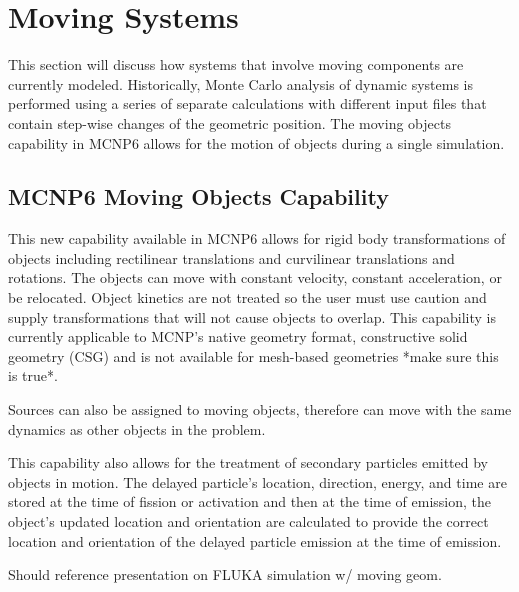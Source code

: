 \section{Moving Systems} \label{sec:moving_sys}
This section will discuss how systems that involve moving components are
currently modeled.
Historically, Monte Carlo analysis of dynamic systems is performed using a series of separate
calculations with different input files that contain step-wise changes of the
geometric position.  The moving objects capability in MCNP6 allows for the
motion of objects during a single simulation.

\subsection{MCNP6 Moving Objects Capability} \label{sec:mcnp_move}
This new capability available in MCNP6 allows for rigid body transformations of
objects
including rectilinear translations and curvilinear translations and rotations.
The objects can move with constant velocity, constant acceleration, or be
relocated.
Object kinetics are not treated so the user must use caution and supply
transformations that will not cause objects to overlap.
This capability is currently applicable to MCNP's native geometry format,
constructive solid geometry (CSG) and is not available for mesh-based
geometries *make sure this is true*.

Sources can also be assigned to moving objects, therefore can move with the
same dynamics as other objects in the problem.

This capability also allows for the treatment of secondary particles emitted by
objects in motion. The delayed particle's location, direction, energy, and
time are stored at the time of fission or activation and then at the time of
emission, the object's updated location and orientation are calculated to
provide the correct location and orientation of the delayed particle emission
at the time of emission. 

Should reference presentation on FLUKA simulation w/ moving geom.


